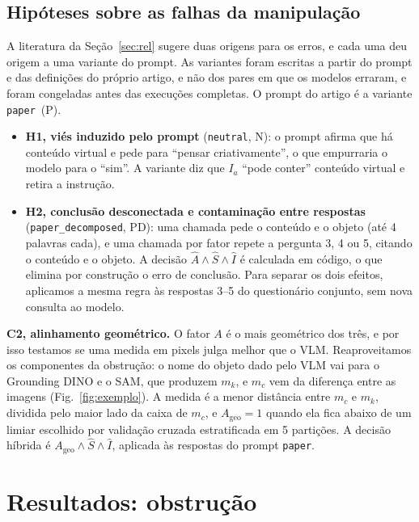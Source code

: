 \documentclass[conference]{IEEEtran}
\newcommand{\Ia}{I_a}
\newcommand{\Ageo}{A_{\mathrm{geo}}}
\newcommand{\var}[1]{\texttt{#1}}
\newcommand{\vpaper}{\var{paper}}
\newcommand{\vneutral}{\var{neutral}}
\newcommand{\vpd}{\var{paper\_\allowbreak decomposed}}
\begin{document}
\subsection{Hipóteses sobre as falhas da manipulação}
\label{sec:hipoteses}
A literatura da Seção~\ref{sec:rel} sugere duas origens para os erros, e cada uma deu origem a uma
variante do prompt. As variantes foram escritas a partir do prompt e das definições do próprio artigo,
e não dos pares em que os modelos erraram, e foram congeladas antes das execuções completas. O prompt do
artigo é a variante \vpaper\ (P).
\begin{itemize}
\item \textbf{H1, viés induzido pelo prompt} (\vneutral, N): o prompt afirma que há conteúdo virtual e
  pede para ``pensar criativamente'', o que empurraria o modelo para o ``sim''. A variante diz que $\Ia$
  ``pode conter'' conteúdo virtual e retira a instrução.
\item \textbf{H2, conclusão desconectada e contaminação entre respostas} (\vpd, PD): uma chamada pede o
  conteúdo e o objeto (até 4 palavras cada), e uma chamada por fator repete a pergunta 3, 4 ou 5,
  citando o conteúdo e o objeto. A decisão $\hat A\wedge\hat S\wedge\hat I$ é calculada em código, o que
  elimina por construção o erro de conclusão. Para separar os dois efeitos, aplicamos a mesma regra às
  respostas 3--5 do questionário conjunto, sem nova consulta ao modelo.
\end{itemize}
\textbf{C2, alinhamento geométrico.} O fator $A$ é o mais geométrico dos três, e por isso testamos se uma
medida em pixels julga melhor que o VLM. Reaproveitamos os componentes da obstrução: o nome do objeto
dado pelo VLM vai para o Grounding DINO e o SAM, que produzem $m_k$, e $m_c$ vem da diferença entre as
imagens (Fig.~\ref{fig:exemplo}). A medida é a menor distância entre $m_c$ e $m_k$, dividida pelo maior
lado da caixa de $m_c$, e $\Ageo=1$ quando ela fica abaixo de um limiar escolhido por validação cruzada
estratificada em 5 partições. A decisão híbrida é $\Ageo\wedge\hat S\wedge\hat I$, aplicada às
respostas do prompt \vpaper.

\section{Resultados: obstrução}
\label{sec:res-obs}
\end{document}
